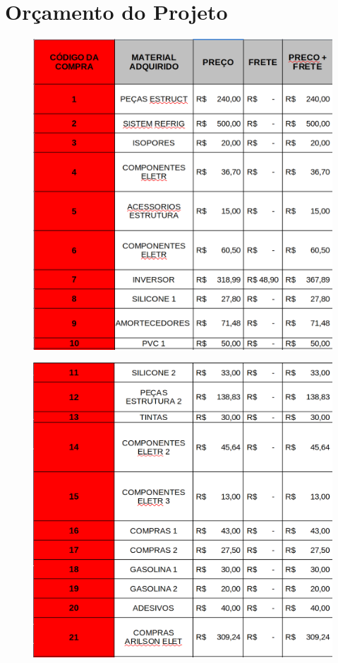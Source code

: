 \chapter[Orçamento do Projeto]{Orçamento do Projeto}

\begin{figure}[H]
	\centering
	\includegraphics[width=16cm]{figuras/orcamento_1.png}
	\caption{}
\end{figure}

\begin{figure}[H]
	\centering
	\includegraphics[width=16cm]{figuras/orcamento-2.png}
	\caption{}
\end{figure}

